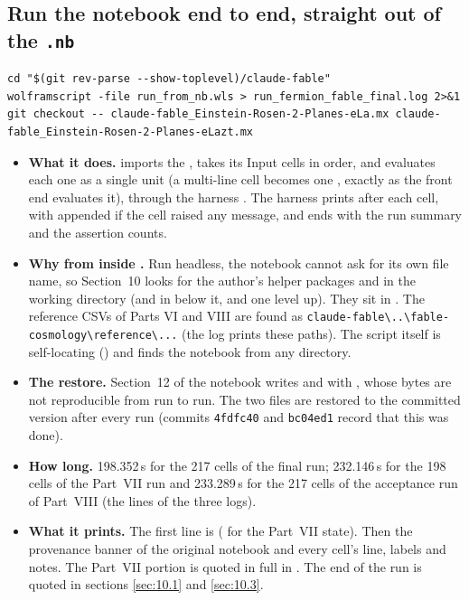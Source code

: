 \subsection{Run the notebook end to end, straight out of the \texttt{.nb}}
\label{sec:11.2}

\begin{Verbatim}
cd "$(git rev-parse --show-toplevel)/claude-fable"
wolframscript -file run_from_nb.wls > run_fermion_fable_final.log 2>&1
git checkout -- claude-fable_Einstein-Rosen-2-Planes-eLa.mx claude-fable_Einstein-Rosen-2-Planes-eLazt.mx
\end{Verbatim}

\begin{itemize}
  \item \textbf{What it does.}  imports the , takes its Input cells in
        order, and evaluates each one as a single unit (a multi-line cell becomes one
        , exactly as the front end evaluates it), through the harness
        . The harness prints  after each cell, with
         appended if the cell raised any message, and ends with the run summary
        and the assertion counts.
  \item \textbf{Why from inside .} Run headless, the notebook cannot ask for its own
        file name, so Section~10 looks for the author's helper packages
         and  in the working directory (and in
         below it, and one level up). They sit in .
        The reference CSVs of Parts VI and VIII are found as
        \verb|claude-fable\..\fable-cosmology\reference\...| (the log prints these paths). The script
        itself is self-locating () and finds the notebook from any directory.
  \item \textbf{The  restore.} Section~12 of the notebook writes
         and  with
        , whose bytes are not reproducible from run to run. The two files are restored
        to the committed version after every run (commits \texttt{4fdfc40} and \texttt{bc04ed1}
        record that this was done).
  \item \textbf{How long.} 198.352\,s for the 217 cells of the final run; 232.146\,s for the 198 cells
        of the Part~VII run and 233.289\,s for the 217 cells of the acceptance run of Part~VIII (the
         lines of the three logs).
  \item \textbf{What it prints.} The first line is 
        ( for the Part~VII state). Then the provenance banner of the original
        notebook and every cell's line,  labels and notes. The Part~VII portion is quoted
        in full in . The end of the run is quoted in sections \ref{sec:10.1} and
        \ref{sec:10.3}.
\end{itemize}


